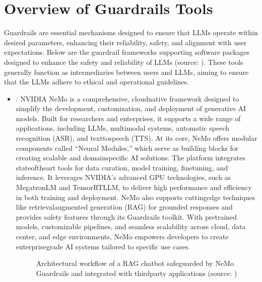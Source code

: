 \documentclass[letterpaper,11pt,english]{sphinxmanual}
\begin{document}
\section{Overview of Guardrails Tools}
\label{\detokenize{guardrails:overview-of-guardrails-tools}}
\sphinxAtStartPar
Guardrails are essential mechanisms designed to ensure that LLMs operate
within desired parameters, enhancing their reliability, safety, and
alignment with user expectations. Below are the guardrail frameworks
supporting software packages designed to enhance the safety and
reliability of LLMs (source: ). These tools generally function as intermediaries between users
and LLMs, aiming to ensure that the LLMs adhere to ethical and
operational guidelines.
\begin{itemize}
\item {} 
\sphinxAtStartPar
{}: NVIDIA NeMo is a comprehensive, cloud\sphinxhyphen{}native
framework designed to simplify the development, customization, and
deployment of generative AI models. Built for researchers and
enterprises, it supports a wide range of applications, including LLMs,
multimodal systems, automatic speech recognition (ASR), and
text\sphinxhyphen{}to\sphinxhyphen{}speech (TTS). At its core, NeMo offers modular components
called “Neural Modules,” which serve as building blocks for creating
scalable and domain\sphinxhyphen{}specific AI solutions. The platform integrates
state\sphinxhyphen{}of\sphinxhyphen{}the\sphinxhyphen{}art tools for data curation, model training, fine\sphinxhyphen{}tuning,
and inference. It leverages NVIDIA’s advanced GPU technologies, such
as Megatron\sphinxhyphen{}LM and TensorRT\sphinxhyphen{}LLM, to deliver high performance and
efficiency in both training and deployment. NeMo also supports
cutting\sphinxhyphen{}edge techniques like retrieval\sphinxhyphen{}augmented generation (RAG) for
grounded responses and provides safety features through its Guardrails
toolkit. With pre\sphinxhyphen{}trained models, customizable pipelines, and seamless
scalability across cloud, data center, and edge environments, NeMo
empowers developers to create enterprise\sphinxhyphen{}grade AI systems tailored to
specific use cases.

\begin{figure}[htbp]
\centering
\capstart

\noindent{}
\caption{Architectural workflow of a RAG chatbot safeguarded by NeMo
Guardrails and integrated with third\sphinxhyphen{}party applications (source: )}\label{\detokenize{guardrails:id9}}\end{figure}

\end{itemize}
\end{document}
